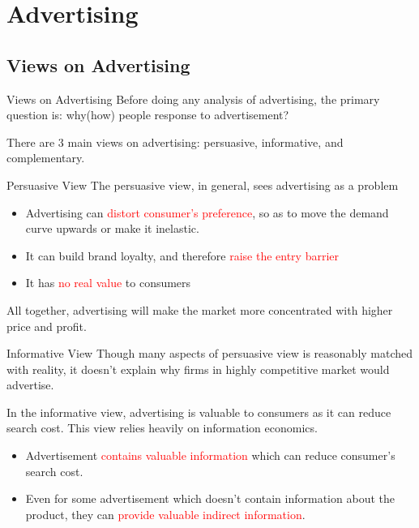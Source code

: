 \documentclass[10pt]{beamer}
\begin{document}
\section{Advertising}

\subsection{Views on Advertising}
\begin{frame}{Views on Advertising}
Before doing any analysis of advertising, the primary question is: why(how) people response to advertisement?

There are 3 main views on advertising: persuasive, informative, and complementary.
\end{frame}

\begin{frame}{Persuasive View}
The persuasive view, in general, sees advertising as a problem
\begin{itemize}
    \item Advertising can \textcolor{red}{distort consumer's preference}, so as to move the demand curve upwards or make it inelastic.
    \item It can build brand loyalty, and therefore \textcolor{red}{raise the entry barrier}
    \item It has \textcolor{red}{no real value} to consumers
\end{itemize}

All together, advertising will make the market more concentrated with higher price and profit.
\end{frame}
 
 
\begin{frame}{Informative View}
Though many aspects of persuasive view is reasonably matched with reality, it doesn't explain why firms in highly competitive market would advertise.

In the informative view, advertising is valuable to consumers as it can reduce search cost. This view relies heavily on information economics.
\begin{itemize}
    \item Advertisement \textcolor{red}{contains valuable information} which can reduce consumer's search cost.
    \item Even for some advertisement which doesn't contain information about the product, they can \textcolor{red}{provide valuable indirect information}.
\end{itemize}
\end{frame}
\end{document}
